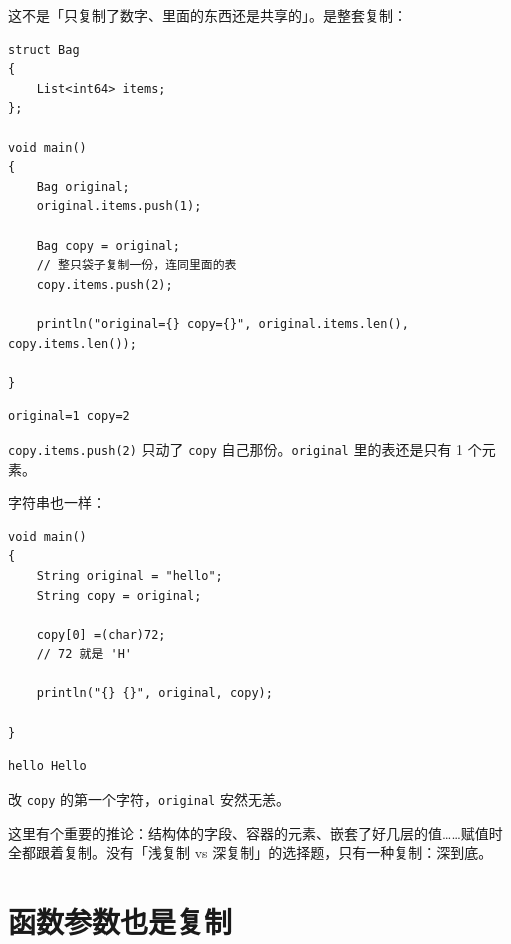 这不是「只复制了数字、里面的东西还是共享的」。是整套复制：

\par
\medskip
\begin{lstlisting}[style=chali]
struct Bag
{
    List<int64> items;
};

void main()
{
    Bag original;
    original.items.push(1);

    Bag copy = original;
    // 整只袋子复制一份，连同里面的表
    copy.items.push(2);

    println("original={} copy={}", original.items.len(), copy.items.len());

}
\end{lstlisting}
\par
\medskip

\par
\medskip
\begin{lstlisting}[style=out]
original=1 copy=2
\end{lstlisting}
\par
\medskip

\texttt{copy.\allowbreak{}items.\allowbreak{}push(\allowbreak{}2)\allowbreak{}} 只动了 \texttt{copy} 自己那份。\texttt{original} 里的表还是只有 1 个元素。

字符串也一样：

\par
\medskip
\begin{lstlisting}[style=chali]
void main()
{
    String original = "hello";
    String copy = original;

    copy[0] =(char)72;
    // 72 就是 'H'

    println("{} {}", original, copy);

}
\end{lstlisting}
\par
\medskip

\par
\medskip
\begin{lstlisting}[style=out]
hello Hello
\end{lstlisting}
\par
\medskip

改 \texttt{copy} 的第一个字符，\texttt{original} 安然无恙。

这里有个重要的推论：结构体的字段、容器的元素、嵌套了好几层的值……赋值时全都跟着复制。没有「浅复制 vs 深复制」的选择题，只有一种复制：深到底。

\section{函数参数也是复制}


